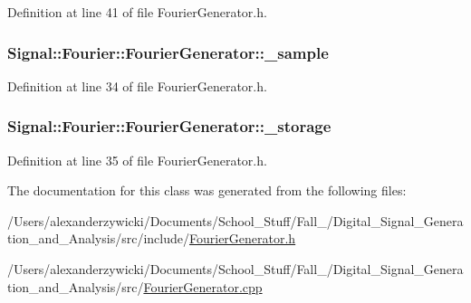 Definition at line 41 of file Fourier\+Generator.\+h.

\hypertarget{classSignal_1_1Fourier_1_1FourierGenerator_ad720bf2b268dc621ace64c54c0816597}{
\subsubsection[{\+\_\+sample}]{ Signal\+::\+Fourier\+::\+Fourier\+Generator\+::\+\_\+sample\hspace{0.3cm}{\ttfamily [protected]}}}\label{classSignal_1_1Fourier_1_1FourierGenerator_ad720bf2b268dc621ace64c54c0816597}


Definition at line 34 of file Fourier\+Generator.\+h.

\hypertarget{classSignal_1_1Fourier_1_1FourierGenerator_ab6e6b79cf56e31c9a1b5766f357f8cfb}{
\subsubsection[{\+\_\+storage}]{ Signal\+::\+Fourier\+::\+Fourier\+Generator\+::\+\_\+storage\hspace{0.3cm}{\ttfamily [protected]}}}\label{classSignal_1_1Fourier_1_1FourierGenerator_ab6e6b79cf56e31c9a1b5766f357f8cfb}


Definition at line 35 of file Fourier\+Generator.\+h.



The documentation for this class was generated from the following files\+:\begin{DoxyCompactItemize}
\item 
/\+Users/alexanderzywicki/\+Documents/\+School\+\_\+\+Stuff/\+Fall\+\_/\+Digital\+\_\+\+Signal\+\_\+\+Generation\+\_\+and\+\_\+\+Analysis/src/include/\hyperlink{FourierGenerator_8h}{Fourier\+Generator.\+h}\item 
/\+Users/alexanderzywicki/\+Documents/\+School\+\_\+\+Stuff/\+Fall\+\_/\+Digital\+\_\+\+Signal\+\_\+\+Generation\+\_\+and\+\_\+\+Analysis/src/\hyperlink{FourierGenerator_8cpp}{Fourier\+Generator.\+cpp}\end{DoxyCompactItemize}
